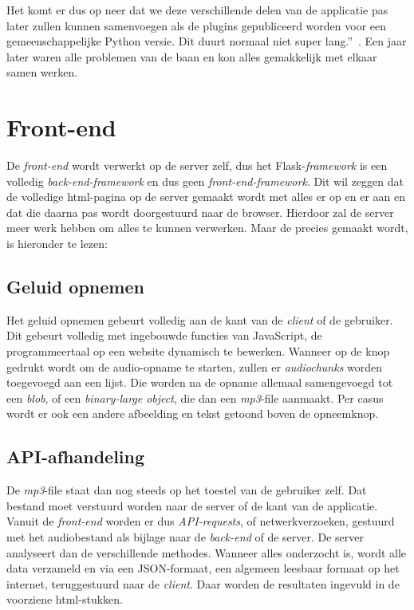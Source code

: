 Het komt er dus op neer dat we deze verschillende delen van de applicatie pas later zullen
kunnen samenvoegen als de plugins gepubliceerd worden voor een gemeenschappelijke
Python versie. Dit duurt normaal niet super lang.''~\autocite{Standaert2021}.
Een jaar later waren alle problemen van de baan en kon alles gemakkelijk met elkaar samen werken.

\section{Front-end}
De \textit{front-end} wordt verwerkt op de server zelf, dus het Flask-\textit{framework} is een volledig \textit{back-end-framework} en dus geen \textit{front-end-framework}. Dit wil zeggen dat de volledige html-pagina op de server gemaakt wordt met alles er op en er aan en dat die daarna pas wordt doorgestuurd naar de browser. Hierdoor zal de server meer werk hebben om alles te kunnen verwerken. Maar de  precies gemaakt wordt, is hieronder te lezen:

\subsection{Geluid opnemen}
Het geluid opnemen gebeurt volledig aan de kant van de \textit{client} of de gebruiker. Dit gebeurt volledig met ingebouwde functies van JavaScript, de programmeertaal op een website dynamisch te bewerken. Wanneer op de knop gedrukt wordt om de audio-opname te starten, zullen er \textit{audiochunks } worden toegevoegd aan een lijst. Die worden na de opname allemaal samengevoegd tot een \textit{blob}, of een \textit{binary-large object}, die dan een \textit{mp3}-file aanmaakt.
Per casus wordt er ook een andere afbeelding en tekst getoond boven de opneemknop.

\subsection{API-afhandeling}
De \textit{mp3}-file staat dan nog steeds op het toestel van de gebruiker zelf. Dat bestand moet verstuurd worden naar de server of de  kant van de applicatie.
Vanuit de \textit{front-end} worden er dus \textit{API-requests}, of netwerkverzoeken, gestuurd met het audiobestand als bijlage naar de \textit{back-end} of de server. De server analyseert dan de verschillende methodes. Wanneer alles onderzocht is, wordt alle data verzameld en via een JSON-formaat, een algemeen leesbaar formaat op het internet, teruggestuurd naar de \textit{client}. Daar worden de resultaten ingevuld in de voorziene html-stukken.

